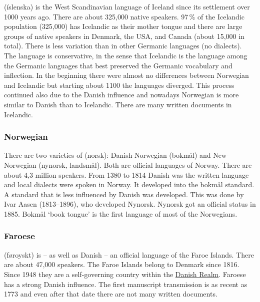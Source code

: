  (íslenska) is the West Scandinavian language of Iceland since its settlement over 1000 years ago. 
There are about 325,000 native speakers. 97\,\% of the Icelandic population (325,000) has Icelandic as their
mother tongue and there are large groups of native speakers in Denmark, the USA, and Canada
(about 15,000 in total). 
There is less variation than in other Germanic languages (no dialects). 
The language is conservative, in the sense that Icelandic
is the language among the Germanic languages that best preserved the Germanic vocabulary and inflection.
In the beginning there were almost no differences between Norwegian and Icelandic but
starting about 1100 the languages diverged. This process continued also due to the Danish
influence and nowadays Norwegian is more similar to Danish than to Icelandic. There are many written documents in Icelandic.

\subsubsection{Norwegian}

There are two varieties of  (norsk): Danish-Norwegian (bokmål) and New-Norwegian (nynorsk, landsmål). 
Both are official languages of Norway.
There are about 4,3 million speakers.
From 1380 to 1814 Danish was the written language and local dialects were spoken in Norway. It developed into the bokmål standard.
A standard that is less influenced by Danish was developed. This was done by Ivar Aasen (1813--1896), 
who developed Nynorsk. Nynorsk got an official status in 1885. Bokmål `book tongue' is the first language of most
of the Norwegians.

\subsubsection{Faroese}

 (føroyskt) is -- as well as Danish -- an official language of the Faroe Islands. There
are about 47,000 speakers. The Faroe Islands belong to Denmark since 1816. Since 1948 they are a
self-governing country within the \href{https://en.wikipedia.org/wiki/Danish_Realm}{Danish Realm}.
Faroese has a strong Danish influence. The first manuscript transmission is as recent as 1773 and
even after that date there are not many written documents. 


